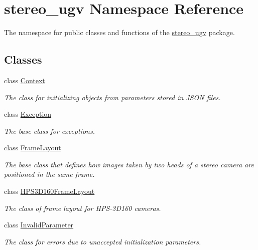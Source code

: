 \hypertarget{namespacestereo__ugv}{}\section{stereo\+\_\+ugv Namespace Reference}
\label{namespacestereo__ugv}


The namespace for public classes and functions of the \hyperlink{namespacestereo__ugv}{stereo\+\_\+ugv} package.  


\subsection*{Classes}
\begin{DoxyCompactItemize}
\item 
class \hyperlink{classstereo__ugv_1_1Context}{Context}
\begin{DoxyCompactList}\small\item\em The class for initializing objects from parameters stored in J\+S\+ON files. \end{DoxyCompactList}\item 
class \hyperlink{classstereo__ugv_1_1Exception}{Exception}
\begin{DoxyCompactList}\small\item\em The base class for exceptions. \end{DoxyCompactList}\item 
class \hyperlink{classstereo__ugv_1_1FrameLayout}{Frame\+Layout}
\begin{DoxyCompactList}\small\item\em The base class that defines how images taken by two heads of a stereo camera are positioned in the same frame. \end{DoxyCompactList}\item 
class \hyperlink{classstereo__ugv_1_1HPS3D160FrameLayout}{H\+P\+S3\+D160\+Frame\+Layout}
\begin{DoxyCompactList}\small\item\em The class of frame layout for H\+P\+S-\/3\+D160 cameras. \end{DoxyCompactList}\item 
class \hyperlink{classstereo__ugv_1_1InvalidParameter}{Invalid\+Parameter}
\begin{DoxyCompactList}\small\item\em The class for errors due to unaccepted initialization parameters. \end{DoxyCompactList}\item 

\end{DoxyCompactItemize}
